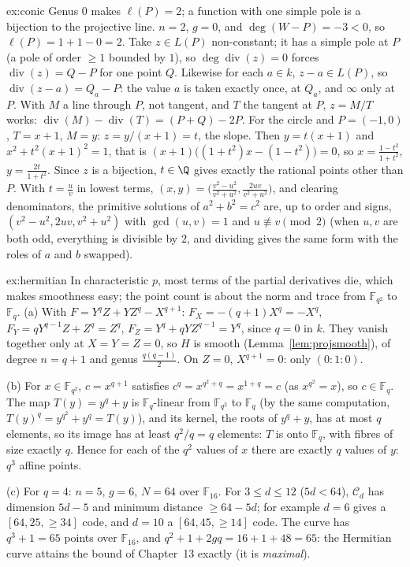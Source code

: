 \begin{solution}{ex:conic}
\idea Genus $0$ makes $\ell(P)=2$; a function with one simple pole is a bijection to the projective line.
\writeup $n=2$, $g=0$, and $\deg(W-P)=-3<0$, so $\ell(P)=1+1-0=2$. Take $z\in L(P)$ non-constant; it has a simple pole at $P$ (a pole of order $\ge1$
bounded by $1$), so $\deg\operatorname{div}(z)=0$ forces $\operatorname{div}(z)=Q-P$ for one point $Q$. Likewise for each $a\in k$, $z-a\in L(P)$, so
$\operatorname{div}(z-a)=Q_a-P$: the value $a$ is taken exactly once, at $Q_a$, and $\infty$ only at $P$. With $M$ a line through $P$, not tangent, and $T$
the tangent at $P$, $z=M/T$ works: $\operatorname{div}(M)-\operatorname{div}(T)=(P+Q)-2P$. For the circle and $P=(-1,0)$, $T=x+1$, $M=y$: $z=y/(x+1)=t$, the
slope. Then $y=t(x+1)$ and $x^2+t^2(x+1)^2=1$, that is $(x+1)\bigl((1+t^2)x-(1-t^2)\bigr)=0$, so $x=\frac{1-t^2}{1+t^2}$, $y=\frac{2t}{1+t^2}$. Since $z$ is a
bijection, $t\in\Q$ gives exactly the rational points other than $P$. With $t=\frac uv$ in lowest terms, $(x,y)=\bigl(\frac{v^2-u^2}{v^2+u^2},\frac{2uv}{v^2+u^2}\bigr)$,
and clearing denominators, the primitive solutions of $a^2+b^2=c^2$ are, up to order and signs, $(v^2-u^2,2uv,v^2+u^2)$ with $\gcd(u,v)=1$ and $u\not\equiv v\pmod2$
(when $u,v$ are both odd, everything is divisible by $2$, and dividing gives the same form with the roles of $a$ and $b$ swapped).
\end{solution}

\begin{solution}{ex:hermitian}
\idea In characteristic $p$, most terms of the partial derivatives die, which makes smoothness easy; the point count is about the norm and trace from
$\mathbb F_{q^2}$ to $\mathbb F_q$.
\writeup (a) With $F=Y^qZ+YZ^q-X^{q+1}$: $F_X=-(q+1)X^q=-X^q$, $F_Y=qY^{q-1}Z+Z^q=Z^q$, $F_Z=Y^q+qYZ^{q-1}=Y^q$, since $q=0$ in $k$. They vanish together only at
$X=Y=Z=0$, so $H$ is smooth (Lemma~\ref{lem:projsmooth}), of degree $n=q+1$ and genus $\frac{q(q-1)}2$. On $Z=0$, $X^{q+1}=0$: only $(0:1:0)$.

(b) For $x\in\mathbb F_{q^2}$, $c=x^{q+1}$ satisfies $c^q=x^{q^2+q}=x^{1+q}=c$ (as $x^{q^2}=x$), so $c\in\mathbb F_q$. The map $T(y)=y^q+y$ is $\mathbb F_q$-linear
from $\mathbb F_{q^2}$ to $\mathbb F_q$ (by the same computation, $T(y)^q=y^{q^2}+y^q=T(y)$), and its kernel, the roots of $y^q+y$, has at most $q$ elements, so its image
has at least $q^2/q=q$ elements: $T$ is onto $\mathbb F_q$, with fibres of size exactly $q$. Hence for each of the $q^2$ values of $x$ there are exactly $q$
values of $y$: $q^3$ affine points.

(c) For $q=4$: $n=5$, $g=6$, $N=64$ over $\mathbb F_{16}$. For $3\le d\le12$ ($5d<64$), $\mathcal C_d$ has dimension $5d-5$ and minimum distance $\ge64-5d$; for
example $d=6$ gives a $[64,25,\ge34]$ code, and $d=10$ a $[64,45,\ge14]$ code. The curve has $q^3+1=65$ points over $\mathbb F_{16}$, and
$q^2+1+2gq=16+1+48=65$: the Hermitian curve attains the bound of Chapter~13 exactly (it is \emph{maximal}).
\end{solution}

